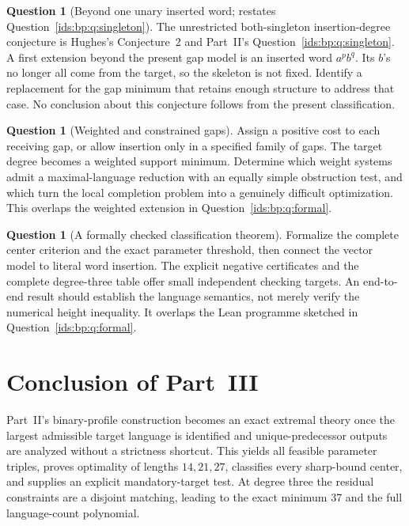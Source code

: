 \documentclass[11pt,letterpaper]{article}
\theoremstyle{definition}\newtheorem{definition}[theorem]{Definition}
\theoremstyle{remark}\newtheorem{remark}[theorem]{Remark}
\theoremstyle{definition}\newtheorem{question}[theorem]{Question}
\begin{document}
\begin{question}[Beyond one unary inserted word; restates Question~\ref{ids:bp:q:singleton}]\label{ids:si:q:singleton}
The unrestricted both-singleton insertion-degree conjecture is Hughes's
Conjecture~2 \cite[Section~11]{Hughes2026} and Part~II's
Question~\ref{ids:bp:q:singleton}. A first extension beyond the
present gap model is an inserted word $a^pb^q$. Its $b$'s no longer all
come from the target, so the skeleton is not fixed. Identify a replacement
for the gap minimum that retains enough structure to address that case.
No conclusion about this conjecture follows from the present classification.
\end{question}

\begin{question}[Weighted and constrained gaps]\label{ids:si:q:weighted}
Assign a positive cost to each receiving gap, or allow insertion only in a
specified family of gaps. The target degree becomes a weighted support
minimum. Determine which weight systems admit a maximal-language reduction
with an equally simple obstruction test, and which turn the local completion
problem into a genuinely difficult optimization. This overlaps the weighted
extension in Question~\ref{ids:bp:q:formal}.
\end{question}

\begin{question}[A formally checked classification theorem]\label{ids:si:q:formal}
Formalize the complete center criterion and the exact parameter threshold,
then connect the vector model to literal word insertion. The explicit
negative certificates and the complete degree-three table offer small
independent checking targets. An end-to-end result should establish the
language semantics, not merely verify the numerical height inequality.
It overlaps the Lean programme sketched in Question~\ref{ids:bp:q:formal}.
\end{question}

\section{Conclusion of Part~III}\label{ids:si:sec:conclusion}
Part~II's binary-profile construction becomes an exact extremal theory
once the largest admissible target language is identified and
unique-predecessor outputs are analyzed without a strictness shortcut. This yields
all feasible parameter triples, proves optimality of lengths $14,21,27$,
classifies every sharp-bound center, and supplies an explicit mandatory-target
test. At degree three the residual constraints are a disjoint matching,
leading to the exact minimum 37 and the full language-count polynomial.
\end{document}
